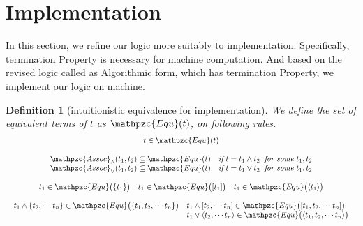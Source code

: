\documentclass[12pt]{article}
\newtheorem{Definition}{Definition}[section]
\begin{document}
\pagebreak
\section{Implementation}

In this section, we refine our logic more suitably to implementation.
Specifically, termination Property is necessary for machine computation.
And based on the revised logic called as Algorithmic form, which has
termination Property, we implement our logic on machine.

\pagebreak
\begin{Definition}[intuitionistic equivalence for implementation]
  \label{equality_for_implementation}
  We define the set of equivalent terms of $t$ as $\mathpzc{Equ}(t)$,
  on following rules.
  \begin{displaymath}
    \begin{array}{c}
      
      t \in \mathpzc{Equ}(t)  \\
      \\

      \mathpzc{Assoc}_\wedge(t_1, t_2) \subseteq
       \mathpzc{Equ}(t) \quad \text{\it if}\ t = t_1 \wedge t_2\;\;
        \text{\it for some}\ t_1, t_2 \\
      
      \mathpzc{Assoc}_\vee(t_1, t_2) \subseteq
       \mathpzc{Equ}(t) \quad \text{\it if}\  t = t_1 \vee t_2\;\;
        \text{\it for some}\ t_1, t_2  \\
      \\

      \begin{array}{lll}
        t_1 \in \mathpzc{Equ}\bigl(\{t_1\} \bigr)
        & t_1 \in \mathpzc{Equ}\bigl([t_1] \bigr)
        & t_1 \in \mathpzc{Equ}\bigl(\langle t_1 \rangle \bigr)
      \end{array}  \\
      \\

      \begin{array}{ll}
        t_1 \wedge \{t_2, \cdots t_n\} \in
        \mathpzc{Equ}\bigl(\{t_1, t_2, \cdots t_n\} \bigr)
        & t_1 \wedge [t_2, \cdots t_n] \in
        \mathpzc{Equ}\bigl([t_1, t_2, \cdots t_n] \bigr)  \\
        & t_1 \vee \langle t_2, \cdots t_n \rangle \in
        \mathpzc{Equ}\bigl(\langle t_1, t_2, \cdots t_n \rangle \bigr)
      \end{array}  \\
      \\
      

\end{array}
\end{displaymath}
\end{Definition}
\end{document}
